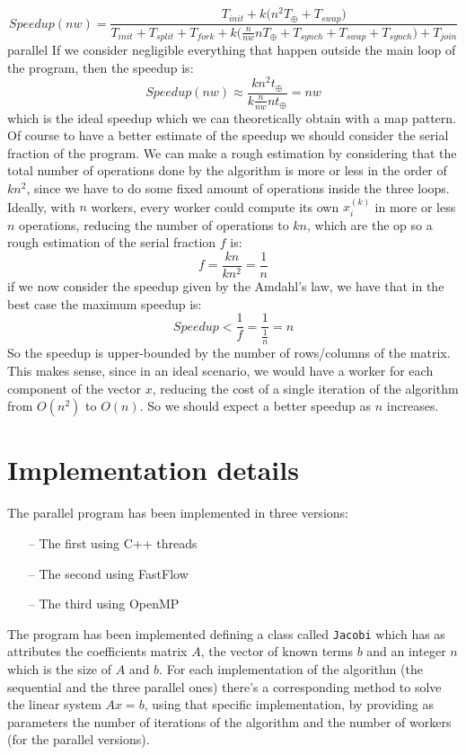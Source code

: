 \documentclass[12pt]{article}
\begin{document}
	\[ Speedup(nw) = \frac{T_{init} + k\Big(n^2T_\oplus + T_{swap}\Big)}{T_{init} + T_{split} + T_{fork} + k\Big(\frac{n}{nw}nT_\oplus + T_{synch} + T_{swap} + T_{synch}\Big) + T_{join}}\]parallel
	If we consider negligible everything that happen outside the main loop of the program, then the speedup is:
	\[ Speedup(nw) \approx \frac{kn^2t_\oplus}{k\frac{n}{nw}nt_\oplus} = nw\]
	which is the ideal speedup which we can theoretically obtain with a map pattern. Of course to have a better estimate of the speedup we should consider the serial fraction of the program. We can make a rough estimation by considering that the total number of operations done by the algorithm is more or less in the order of $kn^2$, since we have to do some fixed amount of operations inside the three loops. Ideally, with $n$ workers, every worker could compute its own $x_i^{(k)}$ in more or less $n$ operations, reducing the number of operations to $kn$, which are the op so a rough estimation of the serial fraction $f$ is: 
	\[ f = \frac{kn}{kn^2} = \frac{1}{n}\]
	if we now consider the speedup given by the Amdahl's law, we have that in the best case the maximum speedup is:
	\[ Speedup < \frac{1}{f} = \frac{1}{\frac{1}{n}} = n\]
	So the speedup is upper-bounded by the number of rows/columns of the matrix. This makes sense, since in an ideal scenario, we would have a worker for each component of the vector $x$, reducing the cost of a single iteration of the algorithm from $O(n^2)$ to $O(n)$. So we should expect a better speedup as $n$ increases. 
	
	
	\section{Implementation details}
	The parallel program has been implemented in three versions:
	\begin{itemize}
		\item[--] The first using C++ threads 
		\item[--] The second using FastFlow
		\item[--] The third using OpenMP
	\end{itemize}
	The program has been implemented defining a class called \verb|Jacobi| which has as attributes the coefficients matrix $A$, the vector of known terms $b$ and an integer $n$ which is the size of $A$ and $b$. For each implementation of the algorithm (the sequential and the three parallel ones) there's a corresponding method to solve the linear system $Ax = b$, using that specific implementation, by providing as parameters the number of iterations of the algorithm and the number of workers (for the parallel versions).
	
\end{document}
